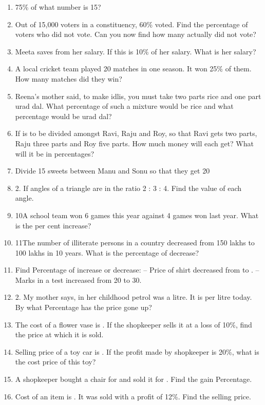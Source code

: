 \begin{enumerate}[label=\thesection.\arabic*,ref=\thesection.\theenumi,resume*]
\item 	75\% of what number is 15?
\item Out of 15,000 voters in a constituency, 60\% voted. Find the percentage of voters who did not vote. Can you now find how many actually did not vote?
\item  Meeta saves  from her salary. If this is 10\% of her salary. What is her salary?
\item  A local cricket team played 20
	matches in one season. It won 25\% of them. How many matches did they win?
\item Reena’s mother said, to make idlis, you must take two parts rice and one part urad dal. What percentage of such a mixture would be rice and what percentage would be urad dal?
\item If  is to be divided amongst Ravi, Raju and Roy, so that Ravi gets two parts, Raju three parts and Roy five parts. How much money will each get? What will it be in percentages?
\item 	Divide 15 sweets between Manu and Sonu so that they get 20 %
\item 2. If angles of a triangle are in the ratio 2 : 3 : 4. Find the value of each angle.
\item 10A school team won 6 games this year against 4 games won last year. What is the per cent increase?
\item 11The number of illiterate persons in a country decreased from 150 lakhs to 100 lakhs in 10 years. What is the percentage of decrease?
\item Find Percentage of increase or decrease: – Price of shirt decreased from  to . – Marks in a test increased from 20 to 30.
\item 2. My mother says, in her childhood petrol was  a litre. It is  per litre today. By what Percentage has the price gone up?
\item The cost of a flower vase is . If the shopkeeper sells it at a loss of 10\%, find the price at which it is sold.
\item Selling price of a toy car is . If the profit made by shopkeeper is 20\%, what is the cost price of this toy?
\item A shopkeeper bought a chair for  and sold it for . Find the gain Percentage. 
\item  Cost of an item is . It was sold with a profit of 12\%. Find the selling price. 

\end{enumerate}
